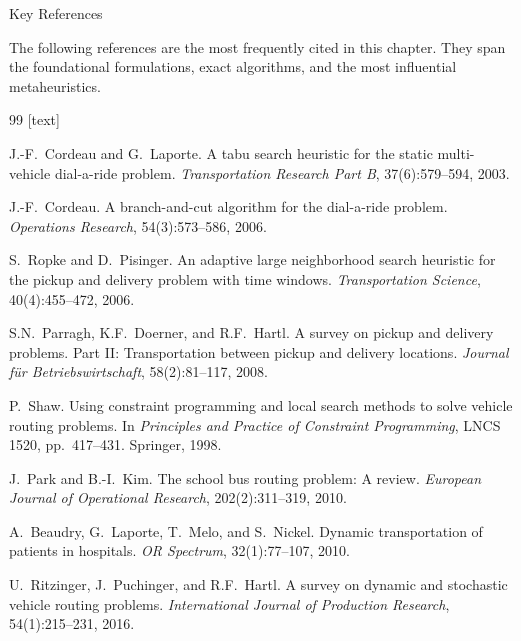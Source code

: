 \documentclass[aspectratio=169,10pt]{beamer}
\begin{document}
\begin{frame}[allowframebreaks]{Key References}

  The following references are the most frequently cited in this chapter.
  They span the foundational formulations, exact algorithms, and the most
  influential metaheuristics.

  \begin{thebibliography}{99}
    [text]

      J.-F.\ Cordeau and G.\ Laporte.
      \newblock A tabu search heuristic for the static multi-vehicle
        dial-a-ride problem.
      \newblock \emph{Transportation Research Part B}, 37(6):579--594, 2003.

      J.-F.\ Cordeau.
      \newblock A branch-and-cut algorithm for the dial-a-ride problem.
      \newblock \emph{Operations Research}, 54(3):573--586, 2006.

      S.\ Ropke and D.\ Pisinger.
      \newblock An adaptive large neighborhood search heuristic for the
        pickup and delivery problem with time windows.
      \newblock \emph{Transportation Science}, 40(4):455--472, 2006.

      S.N.\ Parragh, K.F.\ Doerner, and R.F.\ Hartl.
      \newblock A survey on pickup and delivery problems.  Part II: Transportation
        between pickup and delivery locations.
      \newblock \emph{Journal f\"ur Betriebswirtschaft}, 58(2):81--117, 2008.

      P.\ Shaw.
      \newblock Using constraint programming and local search methods to solve
        vehicle routing problems.
      \newblock In \emph{Principles and Practice of Constraint Programming},
        LNCS 1520, pp.\ 417--431. Springer, 1998.

      J.\ Park and B.-I.\ Kim.
      \newblock The school bus routing problem: A review.
      \newblock \emph{European Journal of Operational Research},
        202(2):311--319, 2010.

      A.\ Beaudry, G.\ Laporte, T.\ Melo, and S.\ Nickel.
      \newblock Dynamic transportation of patients in hospitals.
      \newblock \emph{OR Spectrum}, 32(1):77--107, 2010.

      U.\ Ritzinger, J.\ Puchinger, and R.F.\ Hartl.
      \newblock A survey on dynamic and stochastic vehicle routing problems.
      \newblock \emph{International Journal of Production Research},
        54(1):215--231, 2016.


\end{thebibliography}
\end{frame}
\end{document}
